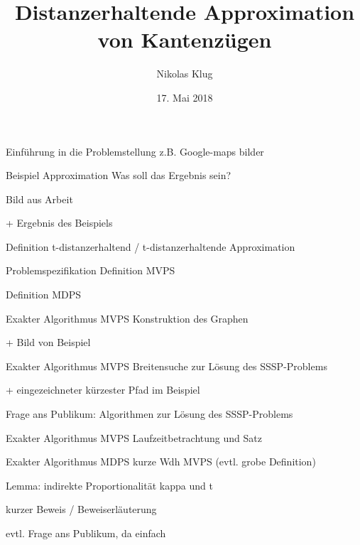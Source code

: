 \documentclass{beamer}
\title[Distanzerhaltende Approximation]{Distanzerhaltende Approximation von Kantenzügen}
\author[N. Klug]{Nikolas Klug}
\institute[Uni Augburg]{Universität Augsburg}
\date{17. Mai 2018}
\begin{document}
	\frame{\titlepage}
	
	\begin{frame}{Einführung in die Problemstellung}
		z.B. Google-maps bilder
		
	\end{frame}
	
	\begin{frame}{Beispiel Approximation}
		Was soll das Ergebnis sein?
		
		Bild aus Arbeit
		
		 + Ergebnis des Beispiels
	\end{frame}
	
	\begin{frame}{Definition t-distanzerhaltend / t-distanzerhaltende Approximation}
		
		
	\end{frame}
	
	\begin{frame}{Problemspezifikation}
		Definition MVPS
		
		Definition MDPS
	\end{frame}
	
	\begin{frame}{Exakter Algorithmus MVPS}
		Konstruktion des Graphen
		
		+ Bild von Beispiel
		
	\end{frame}
	
	\begin{frame}{Exakter Algorithmus MVPS}
		Breitensuche zur Lösung des SSSP-Problems
		
		+ eingezeichneter kürzester Pfad im Beispiel
		
		Frage ans Publikum: Algorithmen zur Lösung des SSSP-Problems
	\end{frame}
	
	\begin{frame}{Exakter Algorithmus MVPS}
		Laufzeitbetrachtung und Satz
	\end{frame}
	
	\begin{frame}{Exakter Algorithmus MDPS}
		kurze Wdh MVPS (evtl. grobe Definition)
		
		Lemma: indirekte Proportionalität kappa und t
		
		kurzer Beweis / Beweiserläuterung
		
		evtl. Frage ans Publikum, da einfach
	\end{frame}
	
\end{document}
